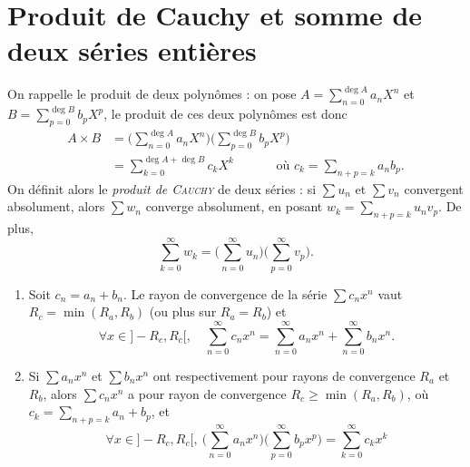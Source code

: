 \section{Produit de Cauchy et somme de deux séries entières}

\begin{rap}
	On rappelle le produit de deux polynômes : on pose $A = \sum_{n=0}^{\deg A} a_n X^n$\/ et $B = \sum_{p=0}^{\deg B} b_p X^p$, le produit de ces deux polynômes est donc
	\begin{align*}
		A \times B &= \Big(\sum_{n=0}^{\deg A} a_n X^n\Big)\Big(\sum_{p=0}^{\deg B} b_p X^p\Big) \\
		&= \sum_{k=0}^{\deg A + \deg B} c_k X^k \quad\quad\quad \text{ où } c_k = \sum_{n+p = k } a_n b_p.
	\end{align*}
	On définit alors le \textit{produit de \textsc{Cauchy}} de deux séries : si $\sum u_n$\/ et $\sum v_n$\/ convergent absolument, alors $\sum w_n$\/ converge absolument, en posant $w_k = \sum_{n+p = k} u_n v_p $.
	De plus, \[
		\sum_{k=0}^\infty w_k = \Big(\sum_{n=0}^\infty u_n\Big)\Big(\sum_{p=0}^\infty v_p\Big)
	.\]
\end{rap}

\begin{prop}
	\begin{enumerate}
		\item Soit $c_n = a_n + b_n$. Le rayon de convergence de la série $\sum c_n x^n$\/ vaut $R_c = \min(R_a, R_b)$ (ou plus sur $R_a = R_b$) et \[
				\forall x \in {]-R_c,R_c[},\quad \sum_{n=0}^\infty c_n x^n = \sum_{n=0}^\infty a_n x^n + \sum_{n=0}^\infty b_n x^n
			.\]
		\item Si $\sum a_n x^n$ et $\sum b_n x^n$ ont respectivement pour rayons de convergence $R_a$ et $R_b$, alors $\sum c_n x^n$ a pour rayon de convergence $R_c \ge \min(R_a, R_b)$, où $c_k = \sum_{n+p = k} a_n + b_p$, et \[
				\forall x \in {]-R_c, R_c[},\:
				\Big(\sum_{n=0}^\infty a_n x^n\Big)\Big(\sum_{p=0}^\infty b_p x^p\Big) = \sum_{k=0}^\infty c_k x^k
			\]
	\end{enumerate}
\end{prop}

